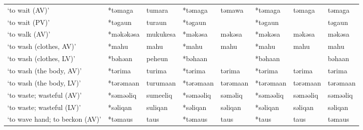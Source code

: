 \begin{landscape}
\begin{longtable}[c]{@{}p{3cm}<{\raggedright}p{2.75cm}<{\raggedright}p{2.75cm}<{\raggedright}p{2.75cm}<{\raggedright}p{2.75cm}<{\raggedright}p{2.75cm}<{\raggedright}p{2.75cm}<{\raggedright}p{2.75cm}<{\raggedright}@{}}
`to wait (AV)'                                       & *təmaga            & tumara                         & *təmaga            & təmawa                     & *təmaga          & təmaga                   & təmaga                            \\
`to wait (PV)'                                       & *təgaun            & turaun                         & *təgaun            &                            & *təgaun          &                          & təgaun                            \\
`to walk (AV)'                                       & *məkəkəsa          & mukukesa                       & *məkəsa            & məkəsa                     & *məkəsa          & məkəsa                   & məkəsa                            \\
`to wash (clothes, AV)'                              & *mahu              & mahu                           & *mahu              & mahu                       & *mahu            & mahu                     & mahu                              \\
`to wash (clothes, LV)'                              & *bəhəan            & peheun                         & *bəhaan            &                            & *bəhaan          &                          & bəhaan                            \\
`to wash (the body, AV)'                             & *tərima            & turima                         & *tərima            & tərima                     & *tərima          & tərima                   & tərima                            \\
`to wash (the body, LV)'                             & *tərəmaan          & turumaan                       & *tərəmaan          & tərəmaan                   & *tərəmaan        & tərəmaan                 & tərəmaan                          \\
`to waste; wasteful (AV)'                            & *səməəliq          & sumeeliq                       & *səməəliq          & səməliq                    & *səməəliq        & səməəliq                 & səməəliq                          \\
`to waste; wasteful (LV)'                            & *səliqan           & suliqan                        & *səliqan           & səliqan                    & *səliqan         & səliqan                  & səliqan                           \\
`to wave hand; to beckon (AV)'                       & *təmaus            & taus                           & *təmaus            & taus                       & *taus            & taus                     & təmaus                            \\

\end{longtable}
\end{landscape}
